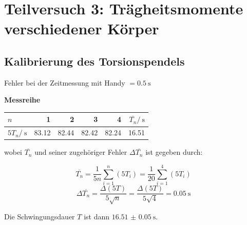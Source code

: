 \section{Teilversuch 3: Trägheitsmomente verschiedener Körper}
    \subsection{Kalibrierung des Torsionspendels}
        Fehler bei der Zeitmessung mit Handy $= \SI{0,5}{\second}$

        \textbf{Messreihe}
            \begin{center}
                \begin{tabular}{l rrrr|r}
                    \toprule
                    $n$ & 1 & 2 & 3 & 4 & $\overbar{T_n}/\SI{}{\second}$ \\
                    \midrule
                    $5T_n/\SI{}{\second}$ & \SI{83.12}{} & \SI{82.44}{} & \SI{82.42}{} & \SI{82.24}{} & \SI{16.51}{} \\
                    \bottomrule
                \end{tabular}
            \end{center}
            wobei $\overbar{T_n}$ und seiner zugehöriger Fehler $\Delta \overbar{T_n}$ ist gegeben durch:
            \vspace{-0.5\baselineskip}
            \begin{multicols}{2}
                \begin{equation}
                    \overbar{T_n} = \frac{1}{5n}\sum_{i=1}^n \left(5T_i\right) = \frac{1}{20}\sum_{i=1}^4 \left(5T_i\right) \label{eqn:mittelT}
                \end{equation}
                \begin{equation}
                    \Delta \overbar{T_n} = \frac{\Delta \left(5T\right)}{5\sqrt{n}} = \frac{\Delta \left(5T\right)}{5\sqrt{4}} = \SI{0.05}{\second} \label{eqn:deltaT}
                \end{equation}
            \end{multicols}
            \vspace{-0.5\baselineskip}
            Die Schwingungsdauer $T$ ist dann $\SI{16.51(5)}{\second}$.

